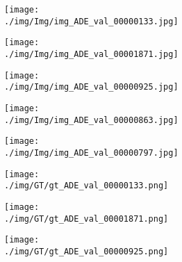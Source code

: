 \documentclass[10pt,twocolumn,letterpaper]{article}
\begin{document}
\begin{figure}
\center
    \begin{subfigure}[t]{0.11\textwidth}
            \begin{subfigure}[t]{\textwidth}
                \texttt{[image: ./img/Img/img\_ADE\_val\_00000133.jpg]}
            \end{subfigure}\vspace{.1ex}

            \begin{subfigure}[t]{\textwidth}
                \texttt{[image: ./img/Img/img\_ADE\_val\_00001871.jpg]}
            \end{subfigure}\vspace{.1ex}

         \begin{subfigure}[t]{\textwidth}
                \texttt{[image: ./img/Img/img\_ADE\_val\_00000925.jpg]}
            \end{subfigure}\vspace{.1ex}

\begin{subfigure}[t]{\textwidth}
                \texttt{[image: ./img/Img/img\_ADE\_val\_00000863.jpg]}
            \end{subfigure}\vspace{.1ex}

            \begin{subfigure}[t]{\textwidth}
                \texttt{[image: ./img/Img/img\_ADE\_val\_00000797.jpg]}
            \end{subfigure}
     \end{subfigure}
\begin{subfigure}[t]{0.11\textwidth}
        \begin{subfigure}[t]{\textwidth}
                \texttt{[image: ./img/GT/gt\_ADE\_val\_00000133.png]}
            \end{subfigure}\vspace{.1ex}

        \begin{subfigure}[t]{\textwidth}
                \texttt{[image: ./img/GT/gt\_ADE\_val\_00001871.png]}
            \end{subfigure}\vspace{.1ex}

        \begin{subfigure}[t]{\textwidth}
                \texttt{[image: ./img/GT/gt\_ADE\_val\_00000925.png]}
            \end{subfigure}\vspace{.1ex}


\end{subfigure}
\end{figure}
\end{document}
